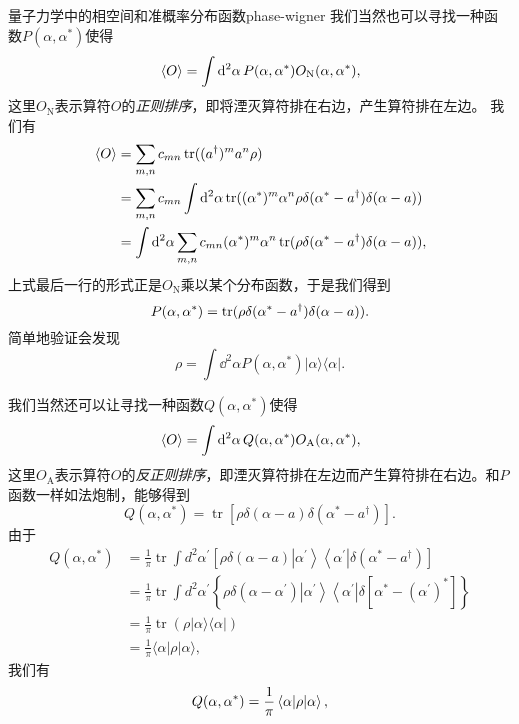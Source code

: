\begin{back}{量子力学中的相空间和准概率分布函数}{phase-wigner}
    我们当然也可以寻找一种函数$P(\alpha, \alpha^*)$使得
    \begin{equation}
        \expval*{O} = \int \dd[2]{\alpha} P(\alpha, \alpha^*) O_\text{N}(\alpha, \alpha^*),
    \end{equation}
    这里$O_\text{N}$表示算符$O$的\emph{正则排序}，即将湮灭算符排在右边，产生算符排在左边。
    我们有
    \[
        \begin{aligned}
            \expval*{O} &= \sum_{m, n} c_{mn} \trace((a^\dagger)^m a^n \rho) \\
            &= \sum_{m, n} c_{mn} \int \dd[2]{\alpha} \trace((\alpha^*)^m \alpha^n \rho \delta(\alpha^* - a^\dagger) \delta(\alpha - a)) \\
            &= \int \dd[2]{\alpha} \sum_{m,n} c_{mn} (\alpha^*)^m \alpha^n \trace(\rho \delta(\alpha^* - a^\dagger) \delta(\alpha - a)),
        \end{aligned}
    \]
    上式最后一行的形式正是$O_\text{N}$乘以某个分布函数，于是我们得到
    \begin{equation}
        P(\alpha, \alpha^*) = \trace(\rho \delta(\alpha^* - a^\dagger) \delta(\alpha - a)).
    \end{equation}
    简单地验证会发现
    \begin{equation}
        \rho=\int \dd^{2} \alpha P\left(\alpha, \alpha^{*}\right)|\alpha\rangle\langle\alpha| .
    \end{equation}

    我们当然还可以让寻找一种函数$Q(\alpha, \alpha^*)$使得
    \begin{equation}
        \expval*{O} = \int \dd[2]{\alpha} Q(\alpha, \alpha^*) O_\text{A}(\alpha, \alpha^*),
    \end{equation}
    这里$O_\text{A}$表示算符$O$的\emph{反正则排序}，即湮灭算符排在左边而产生算符排在右边。和$P$函数一样如法炮制，能够得到
    \begin{equation}
        Q\left(\alpha, \alpha^{*}\right)=\operatorname{tr}\left[\rho \delta(\alpha-a) \delta\left(\alpha^{*}-a^{\dagger}\right)\right].
    \end{equation}
    由于
    \[
        \begin{aligned}
            Q\left(\alpha, \alpha^{*}\right) &=\frac{1}{\pi} \operatorname{tr} \int d^{2} \alpha^{\prime}\left[\rho \delta(\alpha-a)\left|\alpha^{\prime}\right\rangle\left\langle\alpha^{\prime}\right| \delta\left(\alpha^{*}-a^{\dagger}\right)\right] \\
            &=\frac{1}{\pi} \operatorname{tr} \int d^{2} \alpha^{\prime}\left\{\rho \delta\left(\alpha-\alpha^{\prime}\right)\left|\alpha^{\prime}\right\rangle\left\langle\alpha^{\prime}\right| \delta\left[\alpha^{*}-\left(\alpha^{\prime}\right)^{*}\right]\right\} \\
            &=\frac{1}{\pi} \operatorname{tr}(\rho|\alpha\rangle\langle\alpha|) \\
            &=\frac{1}{\pi}\langle\alpha|\rho| \alpha\rangle,
            \end{aligned}
    \]
    我们有
    \begin{equation}
        Q(\alpha, \alpha^*) = \frac{1}{\pi} \mel{\alpha}{\rho}{\alpha},
    \end{equation}


\end{back}
